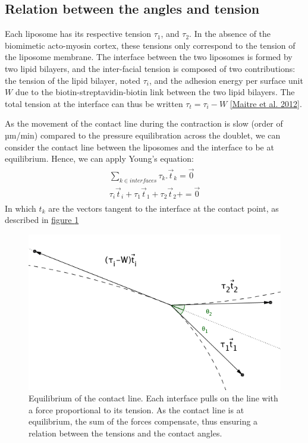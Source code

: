\documentclass[A4paperpaper,11pt,english]{sphinxmanual}
\begin{document}
\subsection{Relation between the angles and tension}
\label{index-latex:relation-between-the-angles-and-tension}
Each liposome has its respective tension \(\tau_1\), and \(\tau_2\).  In the absence
of the biomimetic acto-myosin cortex, these tensions only correspond to the
tension of the liposome membrane. The interface between the two liposomes is
formed by two lipid bilayers, and the inter-facial tension is composed of two contributions:
the tension of the lipid bilayer, noted \(\tau_i\), and the
adhesion energy per surface unit \(W\) due to the biotin-streptavidin-biotin link
between the two lipid bilayers. The total tension at the interface can thus be
written \(\tau_t = \tau_i -W\) {\hyperref[index-latex:maitre2012]{{[}Maitre et al. 2012{]}}}.

As the movement of the contact line during the contraction is slow (order of
µm/min) compared to the pressure equilibration across the doublet, we can consider
the contact line between the liposomes and the interface to be at equilibrium.
Hence, we can apply Young's equation:
\label{index-latex:equation-eqa401}\begin{gather}
\begin{split}\sum_{k \in interfaces} \tau_k. \vec t_k  = \vec 0 \\
\tau_i \vec t_i + \tau_1 \vec t_1 + \tau_2 \vec t_2 + = \vec 0\end{split}\label{index-latex-eqa401}
\end{gather}
In which \(t_k\) are the vectors tangent to the interface at the contact point, as described in \hyperref[index-latex:fig-yd]{figure  \ref*{index-latex:fig-yd}}
\begin{figure}[htbp]
\centering
\capstart

\includegraphics[width=0.600\linewidth]{yd.png}
\caption{Equilibrium of the contact line. Each interface pulls on the line with a
force proportional to its tension. As the contact line is at equilibrium,
the sum of the forces compensate, thus ensuring  a relation between the tensions and the contact angles.}\label{index-latex:fig-yd}\end{figure}
\end{document}
